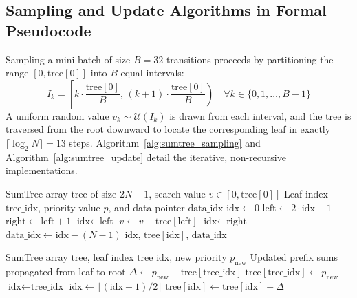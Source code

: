 \documentclass[12pt,a4paper,oneside]{report}
\begin{document}
\subsection{Sampling and Update Algorithms in Formal Pseudocode}
Sampling a mini-batch of size $B=32$ transitions proceeds by partitioning the range $[0, \text{tree}[0]]$ into $B$ equal intervals:
\begin{equation}
    I_k = \left[ k \cdot \frac{\text{tree}[0]}{B}, \, (k + 1) \cdot \frac{\text{tree}[0]}{B} \right) \quad \forall k \in \{0, 1, \dots, B-1\}
\end{equation}
A uniform random value $v_k \sim \mathcal{U}(I_k)$ is drawn from each interval, and the tree is traversed from the root downward to locate the corresponding leaf in exactly $\lceil \log_2 N \rceil = 13$ steps. Algorithm~\ref{alg:sumtree_sampling} and Algorithm~\ref{alg:sumtree_update} detail the iterative, non-recursive implementations.

\begin{algorithm}[htbp]
\caption{Iterative Non-Recursive Binary SumTree Retrieval}
\label{alg:sumtree_sampling}
\begin{algorithmic}[1]
\REQUIRE SumTree array $\text{tree}$ of size $2N - 1$, search value $v \in [0, \text{tree}[0]]$
\ENSURE Leaf index $\text{tree\_idx}$, priority value $p$, and data pointer $\text{data\_idx}$
\STATE $\text{idx} \gets 0$ 
 
    \STATE $\text{left} \gets 2 \cdot \text{idx} + 1$
    \STATE $\text{right} \gets \text{left} + 1$
        \STATE $\text{idx} \gets \text{left}$
    \ELSE
        \STATE $v \gets v - \text{tree}[\text{left}]$
        \STATE $\text{idx} \gets \text{right}$
    \ENDIF
\ENDWHILE
\STATE $\text{data\_idx} \gets \text{idx} - (N - 1)$
\RETURN $\text{idx}, \, \text{tree}[\text{idx}], \, \text{data\_idx}$
\end{algorithmic}
\end{algorithm}

\begin{algorithm}[htbp]
\caption{Iterative Non-Recursive Binary SumTree Priority Update}
\label{alg:sumtree_update}
\begin{algorithmic}[1]
\REQUIRE SumTree array $\text{tree}$, leaf index $\text{tree\_idx}$, new priority $p_{\text{new}}$
\ENSURE Updated prefix sums propagated from leaf to root
\STATE $\Delta \gets p_{\text{new}} - \text{tree}[\text{tree\_idx}]$ 
\STATE $\text{tree}[\text{tree\_idx}] \gets p_{\text{new}}$
\STATE $\text{idx} \gets \text{tree\_idx}$
 
    \STATE $\text{idx} \gets \lfloor (\text{idx} - 1) / 2 \rfloor$ 
    \STATE $\text{tree}[\text{idx}] \gets \text{tree}[\text{idx}] + \Delta$
\ENDWHILE
\end{algorithmic}
\end{algorithm}
\end{document}
